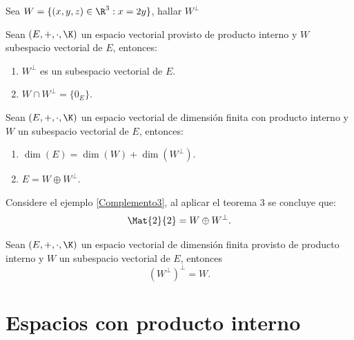\documentclass[compacto,10pt]{pubciencias-notas}
\begin{document}
\begin{ejer}
    Sea $W=\{(x,y,z)\in\R^3: x=2y\}$, hallar $W^\perp$
\end{ejer}
\begin{teo}
Sean $(E,+,\cdot,\K)$ un espacio vectorial provisto de producto interno y
$W$ subespacio vectorial de $E$, entonces:
\begin{enumerate}
\item $W^\perp$ es un subespacio vectorial de $E$.
\item $W \cap W^\perp = \{0_{E}\}$.
\end{enumerate}
\end{teo}

\begin{teo}
Sean $(E,+,\cdot,\K)$ un espacio vectorial de dimensión finita con producto interno y $W$ un subespacio vectorial de $E$, entonces:
\begin{enumerate}
    \item $\dim(E) = \dim(W) + \dim(W^\perp)$.
    \item $E = W \oplus W^\perp$.
\end{enumerate}
\end{teo}


\begin{ejem}\hspace{0pt} Considere el ejemplo \ref{Complemento3}, al aplicar el teorema 3 se concluye que:
\[
    \Mat{2}{2} = W \oplus W^{\perp}.
\]
\end{ejem}

\begin{teo}
Sean $(E,+,\cdot,\K)$ un espacio vectorial de dimensión finita provisto de producto interno y $W$ un subespacio vectorial de $E$, entonces 
\[
    \left(W^{\perp}\right)^{\perp} =  W.
\]
\end{teo}

\setcounter{section}{4}
\section{Espacios con producto interno}
\setcounter{subsection}{2}
\end{document}
